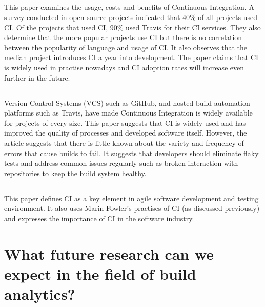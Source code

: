 \documentclass[]{book}
\begin{document}
\subsection{\texorpdfstring{\citet{hilton2016usage}}{@hilton2016usage}}\label{hilton2016usage-1}

This paper examines the usage, costs and benefits of Continuous
Integration. A survey conducted in open-source projects indicated that
40\% of all projects used CI. Of the projects that used CI, 90\% used
Travis for their CI services. They also determine that the more popular
projects use CI but there is no correlation between the popularity of
language and usage of CI. It also observes that the median project
introduces CI a year into development. The paper claims that CI is
widely used in practise nowadays and CI adoption rates will increase
even further in the future.

\subsection{\texorpdfstring{\citet{rausch2017empirical}}{@rausch2017empirical}}\label{rausch2017empirical-1}

Version Control Systems (VCS) such as GitHub, and hosted build
automation platforms such as Travis, have made Continuous Integration is
widely available for projects of every size. This paper suggests that CI
is widely used and has improved the quality of processes and developed
software itself. However, the article suggests that there is little
known about the variety and frequency of errors that cause builds to
fail. It suggests that developers should eliminate flaky tests and
address common issues regularly such as broken interaction with
repositories to keep the build system healthy.

\subsection{\texorpdfstring{\citet{stolberg2009enabling}}{@stolberg2009enabling}}\label{stolberg2009enabling}

This paper defines CI as a key element in agile software development and
testing environment. It also uses Marin Fowler's practises of CI (as
discussed previously) and expresses the importance of CI in the software
industry.

\section{What future research can we expect in the field of build
analytics?}\label{what-future-research-can-we-expect-in-the-field-of-build-analytics}
\end{document}
